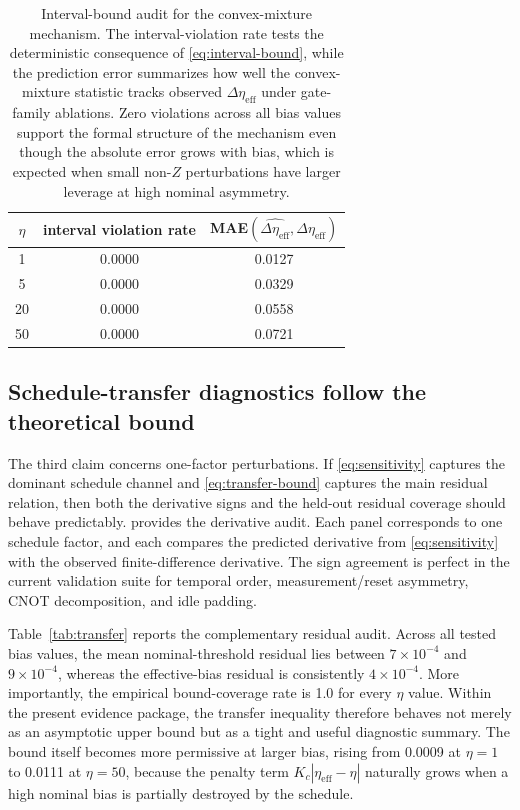 \documentclass{article} %
\begin{document}
\begin{table}[t]
\caption{Interval-bound audit for the convex-mixture mechanism. The interval-violation rate tests the deterministic consequence of \eqref{eq:interval-bound}, while the prediction error summarizes how well the convex-mixture statistic tracks observed $\Delta \eta_{\mathrm{eff}}$ under gate-family ablations. Zero violations across all bias values support the formal structure of the mechanism even though the absolute error grows with bias, which is expected when small non-$Z$ perturbations have larger leverage at high nominal asymmetry.}
\label{tab:interval}
\begin{center}
\small
\renewcommand{\arraystretch}{1.1}
\setlength{\tabcolsep}{4pt}
\begin{tabular}{ccc}
\hline
$\eta$ & interval violation rate & MAE$(\widehat{\Delta\eta_{\mathrm{eff}}},\Delta\eta_{\mathrm{eff}})$ \\
\hline
1 & 0.0000 & 0.0127 \\
5 & 0.0000 & 0.0329 \\
20 & 0.0000 & 0.0558 \\
50 & 0.0000 & 0.0721 \\
\hline
\end{tabular}
\end{center}
\end{table}

\subsection{Schedule-transfer diagnostics follow the theoretical bound}

The third claim concerns one-factor perturbations. If \eqref{eq:sensitivity} captures the dominant schedule channel and \eqref{eq:transfer-bound} captures the main residual relation, then both the derivative signs and the held-out residual coverage should behave predictably.  provides the derivative audit. Each panel corresponds to one schedule factor, and each compares the predicted derivative from \eqref{eq:sensitivity} with the observed finite-difference derivative. The sign agreement is perfect in the current validation suite for temporal order, measurement/reset asymmetry, CNOT decomposition, and idle padding.

Table~\ref{tab:transfer} reports the complementary residual audit. Across all tested bias values, the mean nominal-threshold residual lies between $7\times 10^{-4}$ and $9\times 10^{-4}$, whereas the effective-bias residual is consistently $4\times 10^{-4}$. More importantly, the empirical bound-coverage rate is 1.0 for every $\eta$ value. Within the present evidence package, the transfer inequality therefore behaves not merely as an asymptotic upper bound but as a tight and useful diagnostic summary. The bound itself becomes more permissive at larger bias, rising from 0.0009 at $\eta=1$ to 0.0111 at $\eta=50$, because the penalty term $K_c|\eta_{\mathrm{eff}}-\eta|$ naturally grows when a high nominal bias is partially destroyed by the schedule.
\end{document}
